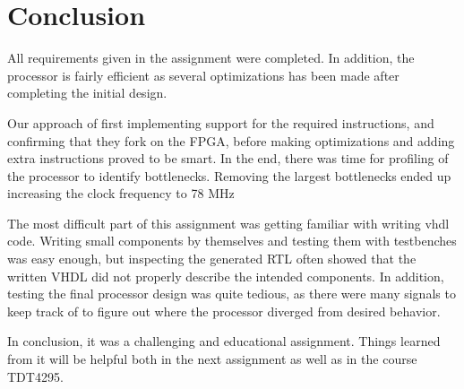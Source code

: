 \section{Conclusion}


All requirements given in the assignment were completed.
In addition, the processor is fairly efficient as several optimizations has been made after completing the initial design.

Our approach of first implementing support for the required instructions, and confirming that they fork on the FPGA, before making optimizations and adding extra instructions proved to be smart.
In the end, there was time for profiling of the processor to identify bottlenecks.
Removing the largest bottlenecks ended up increasing the clock frequency to 78 MHz %

The most difficult part of this assignment was getting familiar with writing vhdl code.
Writing small components by themselves and testing them with testbenches was easy enough,
but inspecting the generated RTL often showed that the written VHDL did not properly describe the intended components.
In addition, testing the final processor design was quite tedious, as there were many signals to keep track of to figure out where the processor diverged from desired behavior.

In conclusion, it was a challenging and educational assignment.
Things learned from it will be helpful both in the next assignment as well as in the course TDT4295.
